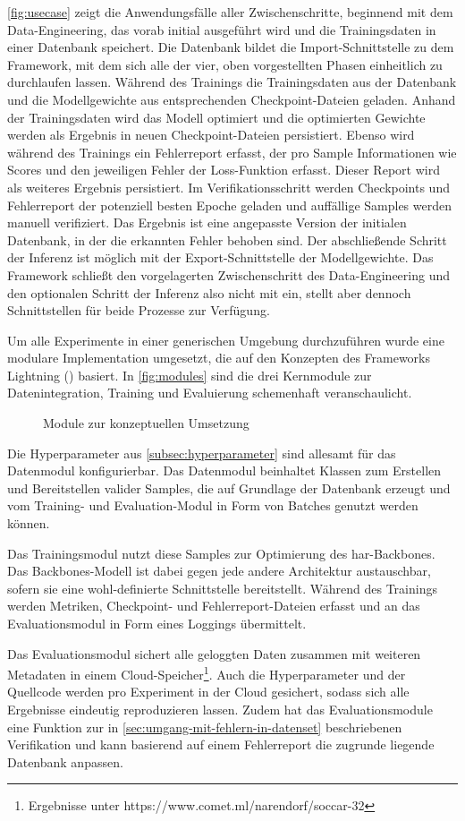 \autoref{fig:usecase} zeigt die Anwendungsfälle aller Zwischenschritte, beginnend mit dem Data-Engineering, das vorab initial ausgeführt wird und die Trainingsdaten in einer Datenbank speichert.
Die Datenbank bildet die Import-Schnittstelle zu dem Framework, mit dem sich alle der vier, oben vorgestellten Phasen einheitlich zu durchlaufen lassen.
Während des Trainings die Trainingsdaten aus der Datenbank und die Modellgewichte aus entsprechenden Checkpoint-Dateien geladen.
Anhand der Trainingsdaten wird das Modell optimiert und die optimierten Gewichte werden als Ergebnis in neuen Checkpoint-Dateien persistiert.
Ebenso wird während des Trainings ein Fehlerreport erfasst, der pro Sample Informationen wie Scores und den jeweiligen Fehler der Loss-Funktion erfasst.
Dieser Report wird als weiteres Ergebnis persistiert.
Im Verifikationsschritt werden Checkpoints und Fehlerreport der potenziell besten Epoche geladen und auffällige Samples werden manuell verifiziert.
Das Ergebnis ist eine angepasste Version der initialen Datenbank, in der die erkannten Fehler behoben sind.
Der abschließende Schritt der Inferenz ist möglich mit der Export-Schnittstelle der Modellgewichte.
Das Framework schließt den vorgelagerten Zwischenschritt des Data-Engineering und den optionalen Schritt der Inferenz also nicht mit ein, stellt aber dennoch Schnittstellen für beide Prozesse zur Verfügung.


Um alle Experimente in einer generischen Umgebung durchzuführen wurde eine modulare Implementation umgesetzt, die auf den Konzepten des Frameworks Lightning (\cite{Falcon19}) basiert.
In \autoref{fig:modules} sind die drei Kernmodule zur Datenintegration, Training und Evaluierung schemenhaft veranschaulicht.

\begin{figure}
    \centering
    \caption{Module zur konzeptuellen Umsetzung}
    \label{fig:modules}
\end{figure}

Die Hyperparameter aus \autoref{subsec:hyperparameter} sind allesamt für das Datenmodul konfigurierbar.
Das Datenmodul beinhaltet Klassen zum Erstellen und Bereitstellen valider Samples, die auf Grundlage der Datenbank erzeugt und vom Training- und Evaluation-Modul in Form von Batches genutzt werden können.

Das Trainingsmodul nutzt diese Samples zur Optimierung des \gls{har}-Backbones.
Das Backbones-Modell ist dabei gegen jede andere Architektur austauschbar, sofern sie eine wohl-definierte Schnittstelle bereitstellt.
Während des Trainings werden Metriken, Checkpoint- und Fehlerreport-Dateien erfasst und an das Evaluationsmodul in Form eines Loggings übermittelt.

Das Evaluationsmodul sichert alle geloggten Daten zusammen mit weiteren Metadaten in einem Cloud-Speicher\footnote{Ergebnisse unter https://www.comet.ml/narendorf/soccar-32}.
Auch die Hyperparameter und der Quellcode werden pro Experiment in der Cloud gesichert, sodass sich alle Ergebnisse eindeutig reproduzieren lassen.
Zudem hat das Evaluationsmodule eine Funktion zur in \autoref{sec:umgang-mit-fehlern-in-datenset} beschriebenen Verifikation und kann basierend auf einem Fehlerreport die zugrunde liegende Datenbank anpassen.
